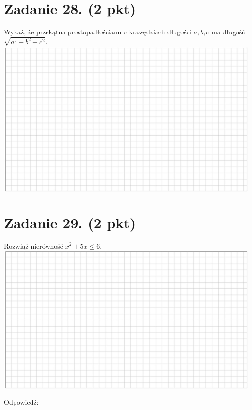 \documentclass[10pt]{article}
\begin{document}
\section*{Zadanie 28. (2 pkt)}
Wykaż, że przekątna prostopadłościanu o krawędziach długości \(a, b, c\) ma długość \(\sqrt{a^{2}+b^{2}+c^{2}}\).\\
\includegraphics[max width=\textwidth, center]{2024_11_21_3a102e13f4b06a61f46fg-11}

\section*{Zadanie 29. (2 pkt)}
Rozwiąż nierówność \(x^{2}+5 x \leqslant 6\).\\
\includegraphics[max width=\textwidth, center]{2024_11_21_3a102e13f4b06a61f46fg-11(1)}

Odpowiedź: \(\qquad\)
\end{document}
